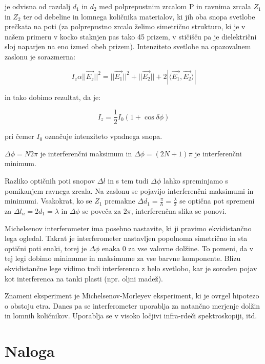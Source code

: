\documentclass[12pt]{report}
\begin{document}
je odvisna od razdalj $d_1$ in $d_2$ med polprepustnim zrcalom P in ravnima zrcala $Z_1$ in $Z_2$ ter od debeline in lomnega količnika materialov, ki jih oba snopa svetlobe prečkata na poti (za polprepustno zrcalo želimo simetrično strukturo, ki je v našem primeru v kocko staknjen pas tako 45 \textdegree prizem, v stičišču pa je dielektrični sloj naparjen na eno izmed obeh prizem). Intenziteto svetlobe na opazovalnem zaslonu je sorazmerna: 

\begin{equation}
  I_z \alpha ||\vec{E_z}||^2 = ||\vec{E_1}||^2 + ||\vec{E_2}|| + 2|\langle \vec{E_1}, \vec{E_2} \rangle|
\end{equation}

in tako dobimo rezultat, da je: 

\begin{equation}
  I_z = \frac{1}{2}I_0(1 + \cos \delta \phi)
\end{equation}

pri čemer $I_0$ označuje intenziteto vpadnega snopa. 

$\Delta \phi = N 2 \pi$ je interferenčni maksimum in $\Delta \phi = (2N + 1) \pi$ je interferenčni minimum. 

 Razliko optičnih poti snopov $\Delta l$ in s tem tudi $\Delta \phi$ lahko spreminjamo s pomikanjem ravnega zrcala. Na zaslonu se pojavijo interferenčni maksimumi in minimumi. Vsakokrat, ko se $Z_1$ premakne $\Delta d_1 = \frac{\pi}{h} = \frac{\lambda}{2}$ se optična pot spremeni za $\Delta l_n = 2 d_1 = \lambda$ in $\Delta \phi$ se poveča za $2\pi$, interferenčna slika se ponovi. 

 Michelsenov interferometer ima posebno nastavite, ki ji pravimo ekvidistančno lega ogledal. Takrat je interferometer nastavljen popolnoma simetrično in sta optični poti enaki, torej je $\Delta \phi$ enaka 0 za vse valovne dolžine. To pomeni, da v tej legi dobimo minimume in maksimume za vse barvne komponente. Blizu ekvidistančne lege vidimo tudi interferenco z belo svetlobo, kar je soroden pojav kot interferenca na tanki plasti (npr. oljni madež). 

 Znameni eksperiment je Michelsenov-Morleyev eksperiment, ki je ovrgel hipotezo o obstoju etra. Danes pa se interferometer uporablja za natančno merjenje dolžin in lomnih količnikov. Uporablja se v visoko ločjivi infra-rdeči spektroskopiji, itd. 


\chapter*{Naloga}
\end{document}
